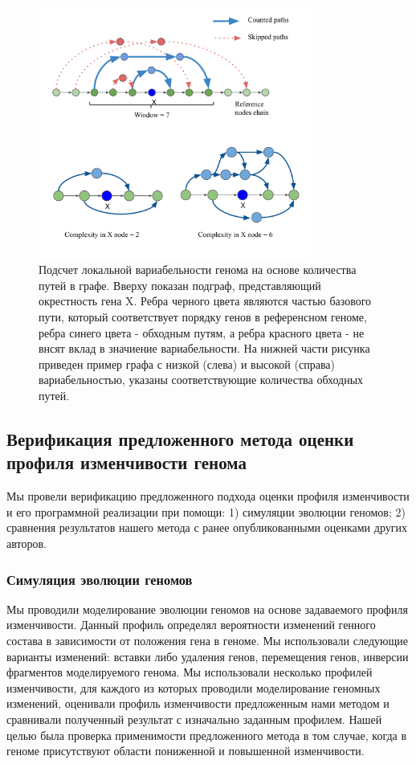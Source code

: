 \begin{figure}[!ht] 
  \center
    \includegraphics[width=0.8\textwidth]{Dissertation/images/complexity/complexity_scheme.png}
  \caption{Подсчет локальной вариабельности генома на основе количества путей в графе. Вверху показан подграф, представляющий окрестность гена X. Ребра черного цвета являются частью базового пути, который соответствует порядку генов в референсном геноме, ребра синего цвета - обходным путям, а ребра красного цвета - не внсят вклад в значиение вариабельности. На нижней части рисунка приведен пример графа с низкой (слева) и высокой (справа) вариабельностью, указаны соответствующие количества обходных путей.}
  \label{img:complexity_scheme} 
\end{figure}




\subsection{Верификация предложенного метода оценки профиля изменчивости генома}
Мы провели верификацию предложенного подхода оценки профиля изменчивости и его программной реализации при помощи: 1) симуляции эволюции геномов; 2) сравнения результатов нашего метода с ранее опубликованными оценками других авторов. 

\subsubsection{Симуляция эволюции геномов}
Мы проводили моделирование эволюции геномов на основе задаваемого профиля изменчивости. Данный профиль определял вероятности изменений генного состава в зависимости от положения гена в геноме. Мы использовали следующие варианты изменений: вставки либо удаления генов, перемещения генов, инверсии фрагментов моделируемого генома. Мы использовали несколько профилей изменчивости, для каждого из которых проводили моделирование геномных изменений, оценивали профиль изменчивости предложенным нами методом и сравнивали полученный результат с изначально заданным профилем. Нашей целью была проверка применимости предложенного метода в том случае, когда в геноме присутствуют области пониженной и повышенной изменчивости.

